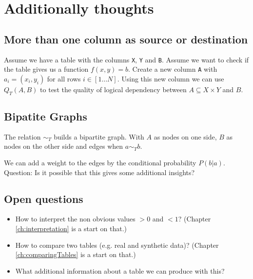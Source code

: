 \documentclass[a4paper]{article}
\begin{document}
\newpage




\newpage
\section{Additionally thoughts}
\subsection{More than one column as source or destination}
Assume we have a table with the columns \texttt{X}, \texttt{Y} and \texttt{B}.
Assume we want to check if the table gives us a function $f(x,y) = b$.
  Create a new column \texttt{A} with $a_i = (x_i, y_i)$ for all rows $i \in [1 \ldots N]$. 
  Using this new column we can use $Q_T(A,B)$ to test the quality of logical dependency between $A \subseteq X \times Y$ and $B$. 

\subsection{Bipatite Graphs}
The relation $\sim_T$ builds a bipartite graph.
With $A$ as nodes on one side, $B$ as nodes on the other side and edges when $a \sim_T b$.

We can add a weight to the edges by the conditional probability $P(b|a)$.
Question: Is it possible that this gives some additional insights?


\subsection{Open questions}
\begin{itemize}
\item How to interpret the non obvious values $> 0$ and $< 1$? (Chapter \ref{ch:interpretation} is a start on that.)
\item How to compare two tables (e.g. real and synthetic data)? (Chapter \ref{ch:comparingTables} is a start on that.)
\item What additional information about a table we can produce with this?
\end{itemize}


\newpage

\end{document}

